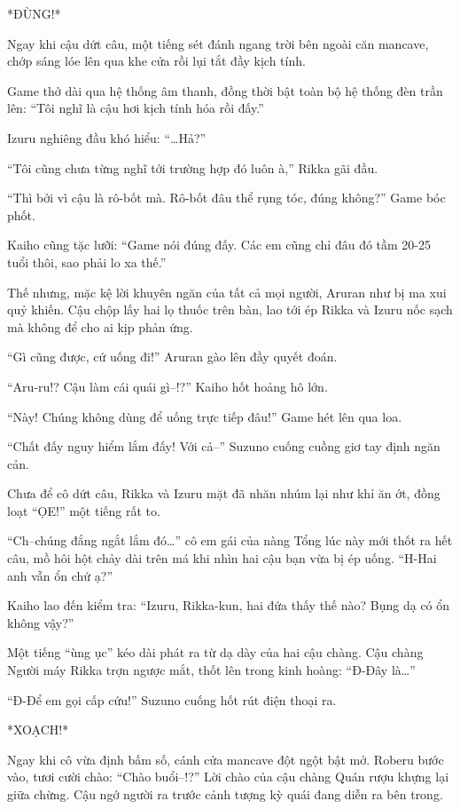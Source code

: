 \documentclass[../main.tex]{subfiles}
\begin{document}
*ĐÙNG!*

Ngay khi cậu dứt câu, một tiếng sét đánh ngang trời bên ngoài căn mancave, chớp sáng lóe lên qua khe cửa rồi lụi tắt đầy kịch tính.

Game thở dài qua hệ thống âm thanh, đồng thời bật toàn bộ hệ thống đèn trần lên: ``Tôi nghĩ là cậu hơi kịch tính hóa rồi đấy.''

Izuru nghiêng đầu khó hiểu: ``\dots Hả?''

``Tôi cũng chưa từng nghĩ tới trường hợp đó luôn à,'' Rikka gãi đầu.

``Thì bởi vì cậu là rô-bốt mà. Rô-bốt đâu thể rụng tóc, đúng không?'' Game bóc phốt.

Kaiho cũng tặc lưỡi: ``Game nói đúng đấy. Các em cũng chỉ đâu đó tầm 20-25 tuổi thôi, sao phải lo xa thế.''

Thế nhưng, mặc kệ lời khuyên ngăn của tất cả mọi người, Aruran như bị ma xui quỷ khiến. Cậu chộp lấy hai lọ thuốc trên bàn, lao tới ép Rikka và Izuru nốc sạch mà không để cho ai kịp phản ứng.


``Gì cũng được, cứ uống đi!'' Aruran gào lên đầy quyết đoán.

``Aru-ru!? Cậu làm cái quái gì--!?'' Kaiho hốt hoảng hô lớn.

``Này! Chúng không dùng để uống trực tiếp đâu!'' Game hét lên qua loa.

``Chất đấy nguy hiểm lắm đấy! Với cả--'' Suzuno cuống cuồng giơ tay định ngăn cản.

Chưa để cô dứt câu, Rikka và Izuru mặt đã nhăn nhúm lại như khỉ ăn ớt, đồng loạt ``ỌE!'' một tiếng rất to.

``Ch--chúng đắng ngắt lắm đó\dots'' cô em gái của nàng Tổng lúc này mới thốt ra hết câu, mồ hôi hột chảy dài trên má khi nhìn hai cậu bạn vừa bị ép uống. ``H-Hai anh vẫn ổn chứ ạ?''

Kaiho lao đến kiểm tra: ``Izuru, Rikka-kun, hai đứa thấy thế nào? Bụng dạ có ổn không vậy?''

Một tiếng ``ùng ục'' kéo dài phát ra từ dạ dày của hai cậu chàng. Cậu chàng Người máy Rikka trợn ngược mắt, thốt lên trong kinh hoàng: ``Đ-Đây là\dots''

``Đ-Để em gọi cấp cứu!'' Suzuno cuống hốt rút điện thoại ra.

*XOẠCH!*

Ngay khi cô vừa định bấm số, cánh cửa mancave đột ngột bật mở. Roberu bước vào, tươi cười chào: ``Chào buổi--!?'' Lời chào của cậu chàng Quán rượu khựng lại giữa chừng. Cậu ngớ người ra trước cảnh tượng kỳ quái đang diễn ra bên trong.
\end{document}
